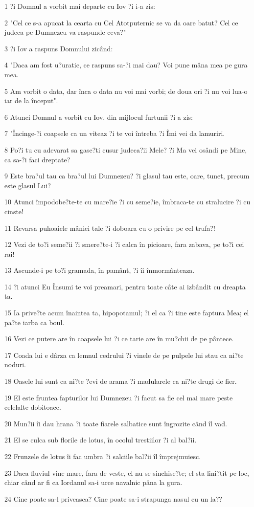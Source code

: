 \par 1 ?i Domnul a vorbit mai departe cu Iov ?i i-a zis:
\par 2 "Cel ce s-a apucat la cearta cu Cel Atotputernic se va da oare batut? Cel ce judeca pe Dumnezeu va raspunde ceva?"
\par 3 ?i Iov a raspuns Domnului zicând:
\par 4 "Daca am fost u?uratic, ce raspuns sa-?i mai dau? Voi pune mâna mea pe gura mea.
\par 5 Am vorbit o data, dar înca o data nu voi mai vorbi; de doua ori ?i nu voi lua-o iar de la început".
\par 6 Atunci Domnul a vorbit cu Iov, din mijlocul furtunii ?i a zis:
\par 7 "Încinge-?i coapsele ca un viteaz ?i te voi întreba ?i Îmi vei da lamuriri.
\par 8 Po?i tu cu adevarat sa gase?ti cusur judeca?ii Mele? ?i Ma vei osândi pe Mine, ca sa-?i faci dreptate?
\par 9 Este bra?ul tau ca bra?ul lui Dumnezeu? ?i glasul tau este, oare, tunet, precum este glasul Lui?
\par 10 Atunci împodobe?te-te cu mare?ie ?i cu seme?ie, îmbraca-te cu stralucire ?i cu cinste!
\par 11 Revarsa puhoaiele mâniei tale ?i doboara cu o privire pe cel trufa?!
\par 12 Vezi de to?i seme?ii ?i smere?te-i ?i calca în picioare, fara zabava, pe to?i cei rai!
\par 13 Ascunde-i pe to?i gramada, în pamânt, ?i îi înmormânteaza.
\par 14 ?i atunci Eu Însumi te voi preamari, pentru toate câte ai izbândit cu dreapta ta.
\par 15 Ia prive?te acum înaintea ta, hipopotamul; ?i el ca ?i tine este faptura Mea; el pa?te iarba ca boul.
\par 16 Vezi ce putere are în coapsele lui ?i ce tarie are în mu?chii de pe pântece.
\par 17 Coada lui e dârza ca lemnul cedrului ?i vinele de pe pulpele lui stau ca ni?te noduri.
\par 18 Oasele lui sunt ca ni?te ?evi de arama ?i madularele ca ni?te drugi de fier.
\par 19 El este fruntea fapturilor lui Dumnezeu ?i facut sa fie cel mai mare peste celelalte dobitoace.
\par 20 Mun?ii îi dau hrana ?i toate fiarele salbatice sunt îngrozite când îl vad.
\par 21 El se culca sub florile de lotus, în ocolul trestiilor ?i al bal?ii.
\par 22 Frunzele de lotus îi fac umbra ?i salciile bal?ii îl împrejmuiesc.
\par 23 Daca fluviul vine mare, fara de veste, el nu se sinchise?te; el sta lini?tit pe loc, chiar când ar fi ca Iordanul sa-i urce navalnic pâna la gura.
\par 24 Cine poate sa-l priveasca? Cine poate sa-i strapunga nasul cu un la??

